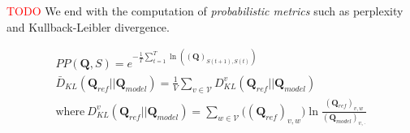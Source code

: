 \documentclass[aspectratio=169, 12pt]{beamer}
\newcommand{\gbm}[1]{\bm{\mathbf{#1}}} %
\begin{document}

    \begin{frame}[plain]{}
        \textcolor{red}{TODO}
        We end with the computation of \emph{probabilistic metrics} such as perplexity and Kullback-Leibler divergence.

        \begin{equation*}
            \begin{gathered}
            PP(\gbm{Q}, S) = e^{-\frac{1}{T}\sum_{t=1}^{T}{\ln{\left((\gbm{Q})_{S(t+1),S(t)}\right)}}} \\[15pt]
            {{\bar D}_{KL}}(\gbm{Q}_{ref} || \gbm{Q}_{model}) = \frac{1}{V}\sum_{v \in \mathcal{V}}{D_{KL}^v(\gbm{Q}_{ref} || \gbm{Q}_{model})} \\[8pt]
            \text{where}\ D_{KL}^v(\gbm{Q}_{ref} || \gbm{Q}_{model}) = \sum_{w \in \mathcal{V}}{\bigl((\gbm{Q}_{ref})_{v,w}\bigr)\ln{\frac{(\gbm{Q}_{ref})_{v,w}}{(\gbm{Q}_{model})_{v,\cdot}}}}
            \end{gathered}
        \end{equation*}
    \end{frame}
\end{document}
